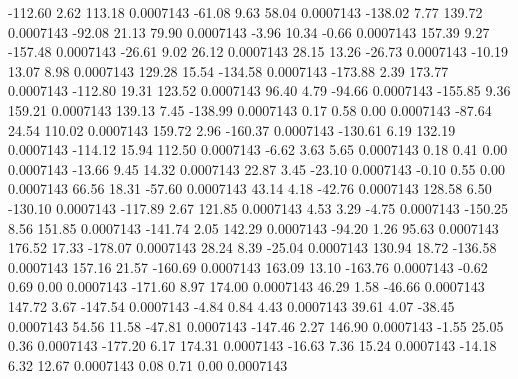      -112.60        2.62      113.18     0.0007143
      -61.08        9.63       58.04     0.0007143
     -138.02        7.77      139.72     0.0007143
      -92.08       21.13       79.90     0.0007143
       -3.96       10.34       -0.66     0.0007143
      157.39        9.27     -157.48     0.0007143
      -26.61        9.02       26.12     0.0007143
       28.15       13.26      -26.73     0.0007143
      -10.19       13.07        8.98     0.0007143
      129.28       15.54     -134.58     0.0007143
     -173.88        2.39      173.77     0.0007143
     -112.80       19.31      123.52     0.0007143
       96.40        4.79      -94.66     0.0007143
     -155.85        9.36      159.21     0.0007143
      139.13        7.45     -138.99     0.0007143
        0.17        0.58        0.00     0.0007143
      -87.64       24.54      110.02     0.0007143
      159.72        2.96     -160.37     0.0007143
     -130.61        6.19      132.19     0.0007143
     -114.12       15.94      112.50     0.0007143
       -6.62        3.63        5.65     0.0007143
        0.18        0.41        0.00     0.0007143
      -13.66        9.45       14.32     0.0007143
       22.87        3.45      -23.10     0.0007143
       -0.10        0.55        0.00     0.0007143
       66.56       18.31      -57.60     0.0007143
       43.14        4.18      -42.76     0.0007143
      128.58        6.50     -130.10     0.0007143
     -117.89        2.67      121.85     0.0007143
        4.53        3.29       -4.75     0.0007143
     -150.25        8.56      151.85     0.0007143
     -141.74        2.05      142.29     0.0007143
      -94.20        1.26       95.63     0.0007143
      176.52       17.33     -178.07     0.0007143
       28.24        8.39      -25.04     0.0007143
      130.94       18.72     -136.58     0.0007143
      157.16       21.57     -160.69     0.0007143
      163.09       13.10     -163.76     0.0007143
       -0.62        0.69        0.00     0.0007143
     -171.60        8.97      174.00     0.0007143
       46.29        1.58      -46.66     0.0007143
      147.72        3.67     -147.54     0.0007143
       -4.84        0.84        4.43     0.0007143
       39.61        4.07      -38.45     0.0007143
       54.56       11.58      -47.81     0.0007143
     -147.46        2.27      146.90     0.0007143
       -1.55       25.05        0.36     0.0007143
     -177.20        6.17      174.31     0.0007143
      -16.63        7.36       15.24     0.0007143
      -14.18        6.32       12.67     0.0007143
        0.08        0.71        0.00     0.0007143
